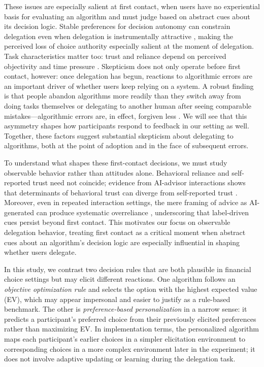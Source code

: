 \documentclass[a4paper, 12pt, fleqn]{article}
\theoremstyle{definition}
\begin{document}
These issues are especially salient at first contact, when users have no experiential basis for evaluating an algorithm and must judge based on abstract cues about its decision logic. Stable preferences for decision autonomy can constrain delegation even when delegation is instrumentally attractive \citep{Ivanova-Stenzel2025}, making the perceived loss of choice authority especially salient at the moment of delegation. Task characteristics matter too: trust and reliance depend on perceived objectivity and time pressure \citep{Yang2025}. Skepticism does not only operate before first contact, however: once delegation has begun, reactions to algorithmic errors are an important driver of whether users keep relying on a system. A robust finding is that people abandon algorithms more readily than they switch away from doing tasks themselves or delegating to another human after seeing comparable mistakes---algorithmic errors are, in effect, forgiven less \citep{Dietvorst2015,Renier2021}. We will see that this asymmetry shapes how participants respond to feedback in our setting as well. Together, these factors suggest substantial skepticism about delegating to algorithms, both at the point of adoption and in the face of subsequent errors.

To understand what shapes these first-contact decisions, we must study observable behavior rather than attitudes alone. Behavioral reliance and self-reported trust need not coincide; evidence from AI-advisor interactions shows that determinants of behavioral trust can diverge from self-reported trust \citep{Schreibelmayr2025}. Moreover, even in repeated interaction settings, the mere framing of advice as AI-generated can produce systematic overreliance \citep{Klingbeil2024}, underscoring that label-driven cues persist beyond first contact. This motivates our focus on observable delegation behavior, treating first contact as a critical moment when abstract cues about an algorithm's decision logic are especially influential in shaping whether users delegate.

In this study, we contrast two decision rules that are both plausible in financial choice settings but may elicit different reactions. One algorithm follows an \emph{objective optimization rule} and selects the option with the highest expected value (EV), which may appear impersonal and easier to justify as a rule-based benchmark. The other is \emph{preference-based personalization} in a narrow sense: it predicts a participant's preferred choice from their previously elicited preferences rather than maximizing EV. In implementation terms, the personalized algorithm maps each participant's earlier choices in a simpler elicitation environment to corresponding choices in a more complex environment later in the experiment; it does not involve adaptive updating or learning during the delegation task.
\end{document}
